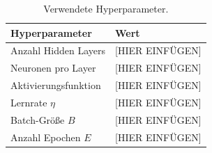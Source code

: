 \begin{table}[htbp]
    \centering
    \small
    \begin{tabular}{l l}
    \toprule
    \textbf{Hyperparameter} & \textbf{Wert} \\
    \midrule
    Anzahl Hidden Layers  & [HIER EINFÜGEN] \\
    Neuronen pro Layer    & [HIER EINFÜGEN] \\
    Aktivierungsfunktion  & [HIER EINFÜGEN] \\
    Lernrate $\eta$       & [HIER EINFÜGEN] \\
    Batch-Größe $B$       & [HIER EINFÜGEN] \\
    Anzahl Epochen $E$    & [HIER EINFÜGEN] \\
    \bottomrule
    \end{tabular}
    \caption{Verwendete Hyperparameter.}
    \label{tab:hyperparameter}
\end{table}

\newpage